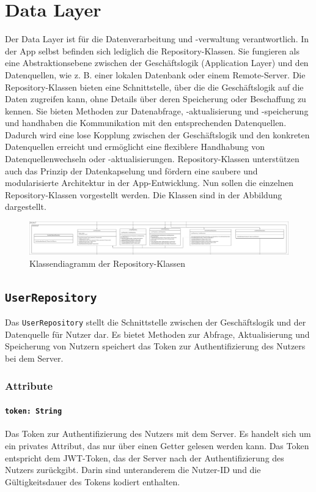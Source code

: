 \documentclass{entwurfsheft}
\begin{document}
\newpage
\section{Data Layer}
Der Data Layer ist für die Datenverarbeitung und -verwaltung verantwortlich. In der App selbst befinden sich lediglich die Repository-Klassen. Sie fungieren als eine Abstraktionsebene zwischen der Geschäftslogik (Application Layer) und den Datenquellen, wie z. B. einer lokalen Datenbank oder einem Remote-Server. Die Repository-Klassen bieten eine Schnittstelle, über die die Geschäftslogik auf die Daten zugreifen kann, ohne Details über deren Speicherung oder Beschaffung zu kennen. Sie bieten Methoden zur Datenabfrage, -aktualisierung und -speicherung und handhaben die Kommunikation mit den entsprechenden Datenquellen. Dadurch wird eine lose Kopplung zwischen der Geschäftslogik und den konkreten Datenquellen erreicht und ermöglicht eine flexiblere Handhabung von Datenquellenwechseln oder -aktualisierungen. Repository-Klassen unterstützen auch das Prinzip der Datenkapselung und fördern eine saubere und modularisierte Architektur in der App-Entwicklung.
Nun sollen die einzelnen Repository-Klassen vorgestellt werden. Die Klassen sind in der Abbildung dargestellt.
\begin{figure}[htp]
    \centering
    \includegraphics[width=\textwidth]{images/dataLayer/dataLayer.pdf}
    \caption{Klassendiagramm der Repository-Klassen}
    \label{fig:dataLayer}
\end{figure}
\newpage
\subsection{\texttt{UserRepository}}\label{sec:UserRepository}
Das \texttt{UserRepository} stellt die Schnittstelle zwischen der Geschäftslogik und der Datenquelle für Nutzer dar. Es bietet Methoden zur Abfrage, Aktualisierung und Speicherung von Nutzern speichert das Token zur Authentifizierung des Nutzers bei dem Server.
\subsubsection*{Attribute}
\paragraph{\texttt{token: String}}
Das Token zur Authentifizierung des Nutzers mit dem Server. Es handelt sich um ein privates Attribut, das nur über einen Getter gelesen werden kann. Das Token entspricht dem JWT-Token, das der Server nach der Authentifizierung des Nutzers zurückgibt. Darin sind unteranderem die Nutzer-ID und die Gültigkeitsdauer des Tokens kodiert enthalten.
\end{document}
